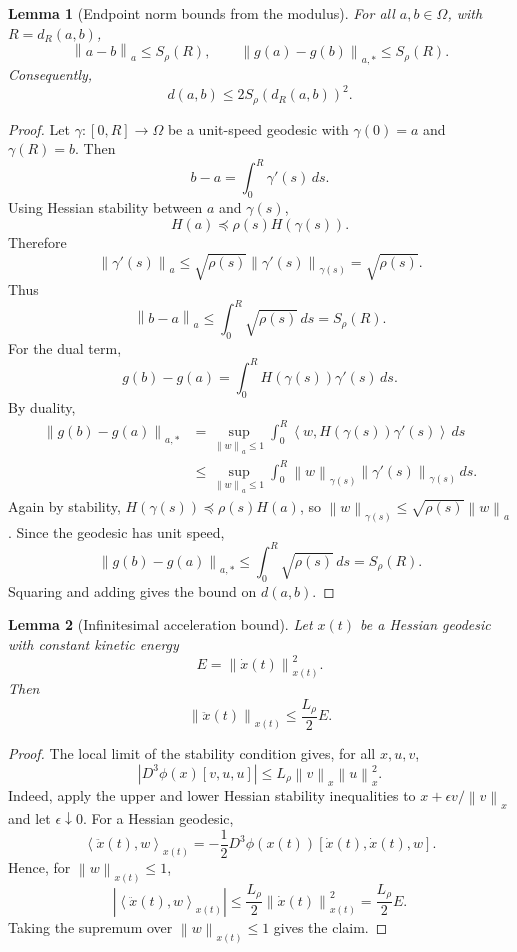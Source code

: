 \documentclass[11pt]{article}
\newtheorem{lemma}{Lemma}
\newcommand{\ip}[2]{\left\langle #1,#2\right\rangle}
\newcommand{\norm}[1]{\left\lVert #1\right\rVert}
\begin{document}
\begin{lemma}[Endpoint norm bounds from the modulus]
For all $a,b\in\Omega$, with $R=d_R(a,b)$,
\[
    \norm{a-b}_a
    \le
    S_\rho(R),
    \qquad
    \norm{g(a)-g(b)}_{a,*}
    \le
    S_\rho(R).
\]
Consequently,
\[
    d(a,b)
    \le
    2S_\rho(d_R(a,b))^2.
\]
\end{lemma}

\begin{proof}
Let $\gamma:[0,R]\to\Omega$ be a unit-speed geodesic with $\gamma(0)=a$ and
$\gamma(R)=b$.  Then
\[
    b-a=\int_0^R \gamma'(s)\,ds.
\]
Using Hessian stability between $a$ and $\gamma(s)$,
\[
    H(a)\preceq \rho(s)H(\gamma(s)).
\]
Therefore
\[
    \norm{\gamma'(s)}_a
    \le
    \sqrt{\rho(s)}\norm{\gamma'(s)}_{\gamma(s)}
    =
    \sqrt{\rho(s)}.
\]
Thus
\[
    \norm{b-a}_a
    \le
    \int_0^R \sqrt{\rho(s)}\,ds
    =
    S_\rho(R).
\]
For the dual term,
\[
    g(b)-g(a)=\int_0^R H(\gamma(s))\gamma'(s)\,ds.
\]
By duality,
\[
\begin{aligned}
    \norm{g(b)-g(a)}_{a,*}
    &=
    \sup_{\norm{w}_a\le1}
    \int_0^R \ip{w}{H(\gamma(s))\gamma'(s)}\,ds \\
    &\le
    \sup_{\norm{w}_a\le1}
    \int_0^R \norm{w}_{\gamma(s)}\norm{\gamma'(s)}_{\gamma(s)}\,ds.
\end{aligned}
\]
Again by stability, $H(\gamma(s))\preceq \rho(s)H(a)$, so
$\norm{w}_{\gamma(s)}\le\sqrt{\rho(s)}\norm{w}_a$.  Since the geodesic has unit speed,
\[
    \norm{g(b)-g(a)}_{a,*}
    \le
    \int_0^R \sqrt{\rho(s)}\,ds
    =
    S_\rho(R).
\]
Squaring and adding gives the bound on $d(a,b)$.
\end{proof}

\begin{lemma}[Infinitesimal acceleration bound]
Let $x(t)$ be a Hessian geodesic with constant kinetic energy
\[
    E=\norm{\dot x(t)}_{x(t)}^2.
\]
Then
\[
    \norm{\ddot x(t)}_{x(t)}
    \le
    \frac{L_\rho}{2}E.
\]
\end{lemma}

\begin{proof}
The local limit of the stability condition gives, for all $x,u,v$,
\[
    |D^3\phi(x)[v,u,u]|
    \le
    L_\rho\norm{v}_x\norm{u}_x^2.
\]
Indeed, apply the upper and lower Hessian stability inequalities to
$x+\epsilon v/\norm{v}_x$ and let $\epsilon\downarrow0$.
For a Hessian geodesic,
\[
    \ip{\ddot x(t)}{w}_{x(t)}
    =
    -\frac12 D^3\phi(x(t))[\dot x(t),\dot x(t),w].
\]
Hence, for $\norm{w}_{x(t)}\le1$,
\[
    |\ip{\ddot x(t)}{w}_{x(t)}|
    \le
    \frac{L_\rho}{2}\norm{\dot x(t)}_{x(t)}^2
    =
    \frac{L_\rho}{2}E.
\]
Taking the supremum over $\norm{w}_{x(t)}\le1$ gives the claim.
\end{proof}
\end{document}
